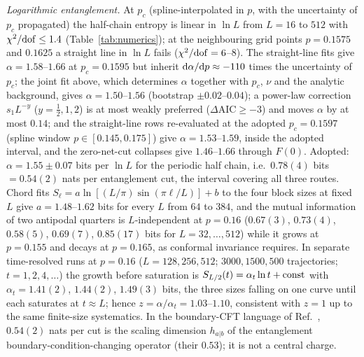 \documentclass[aps,prx,reprint,superscriptaddress,nobibnotes,longbibliography]{revtex4-2}
\theoremstyle{remark}
\begin{document}
\emph{Logarithmic entanglement.}  At $p_c$ (spline-interpolated in $p$, with the uncertainty of $p_c$ propagated) the half-chain entropy is linear in $\ln L$ from $L=16$ to $512$ with $\chi^2/{\rm dof}\le1.4$ (Table~\ref{tab:numerics}); at the neighbouring grid points $p=0.1575$ and $0.1625$ a straight line in $\ln L$ fails ($\chi^2/{\rm dof}=6$--$8$).  The straight-line fits give $\alpha=1.58$--$1.66$ at $p_c=0.1595$ but inherit ${\rm d}\alpha/{\rm d}p\approx-110$ times the uncertainty of $p_c$; the joint fit above, which determines $\alpha$ together with $p_c$, $\nu$ and the analytic background, gives $\alpha=1.50$--$1.56$ (bootstrap $\pm0.02$--$0.04$); a power-law correction $s_1L^{-y}$ ($y=\tfrac12,1,2$) is at most weakly preferred ($\Delta\mathrm{AIC}\ge-3$) and moves $\alpha$ by at most $0.14$; and the straight-line rows re-evaluated at the adopted $p_c=0.1597$ (spline window $p\in[0.145,0.175]$) give $\alpha=1.53$--$1.59$, inside the adopted interval, and the zero-net-cut collapses give $1.46$--$1.66$ through $F(0)$.  Adopted: $\alpha=1.55\pm0.07$ bits per $\ln L$ for the periodic half chain, i.e.\ $0.78(4)$ bits $=0.54(2)$ nats per entanglement cut, the interval covering all three routes.  Chord fits $S_\ell=a\ln[(L/\pi)\sin(\pi\ell/L)]+b$ to the four block sizes at fixed $L$ give $a=1.48$--$1.62$ bits for every $L$ from $64$ to $384$, and the mutual information of two antipodal quarters is $L$-independent at $p=0.16$ ($0.67(3)$, $0.73(4)$, $0.58(5)$, $0.69(7)$, $0.85(17)$ bits for $L=32,\dots,512$) while it grows at $p=0.155$ and decays at $p=0.165$, as conformal invariance requires.  In separate time-resolved runs at $p=0.16$ ($L=128,256,512$; $3000,1500,500$ trajectories; $t=1,2,4,\dots$) the growth before saturation is $S_{L/2}(t)=\alpha_t\ln t+{\rm const}$ with $\alpha_t=1.41(2)$, $1.44(2)$, $1.49(3)$ bits, the three sizes falling on one curve until each saturates at $t\approx L$; hence $z=\alpha/\alpha_t=1.03$--$1.10$, consistent with $z=1$ up to the same finite-size systematics.  In the boundary-CFT language of Ref.~\cite{Li2021}, $0.54(2)$ nats per cut is the scaling dimension $h_{a|b}$ of the entanglement boundary-condition-changing operator (their $0.53$); it is not a central charge.
\end{document}
